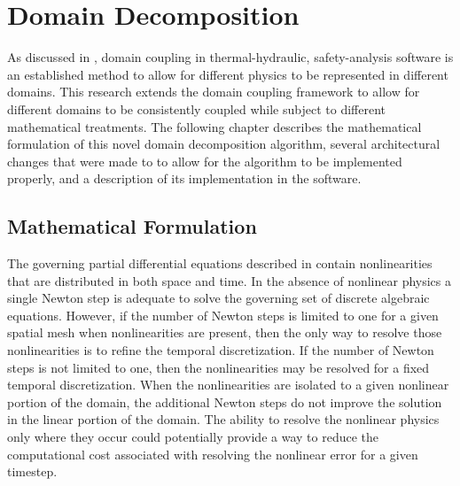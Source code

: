\chapter{Domain Decomposition}
\label{chap:domDecomposition}
As discussed in , domain coupling in thermal-hydraulic, safety-analysis software is an established method to allow for different physics to be represented in different domains.
This research extends the domain coupling framework to allow for different domains to be consistently coupled while subject to different mathematical treatments.
The following chapter describes the mathematical formulation of this novel domain decomposition algorithm, several architectural changes that were made to \cobra{} to allow for the algorithm to be implemented properly, and a description of its implementation in the software.

\section{Mathematical Formulation}
\label{sec:domDecompMath}

The governing partial differential equations described in  contain nonlinearities that are distributed in both space and time.
In the absence of nonlinear physics a single Newton step is adequate to solve the governing set of discrete algebraic equations.
However, if the number of Newton steps is limited to one for a given spatial mesh when nonlinearities are present, then the only way to resolve those nonlinearities is to refine the temporal discretization.
If the number of Newton steps is not limited to one, then the nonlinearities may be resolved for a fixed temporal discretization.
When the nonlinearities are isolated to a given nonlinear portion of the domain, the additional Newton steps do not improve the solution in the linear portion of the domain.
The ability to resolve the nonlinear physics only where they occur could potentially provide a way to reduce the computational cost associated with resolving the nonlinear error for a given timestep.

